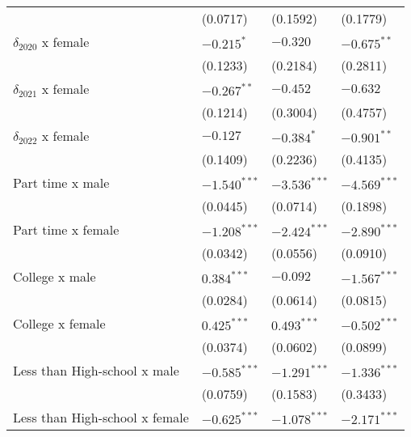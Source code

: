 \begin{tabular}{llll}
                                       &           (0.0717) &           (0.1592) &           (0.1779) \\
$\delta_{2020}$ x female               &         $-0.215^*$ &           $-0.320$ &      $-0.675^{**}$ \\
                                       &           (0.1233) &           (0.2184) &           (0.2811) \\
$\delta_{2021}$ x female               &      $-0.267^{**}$ &           $-0.452$ &           $-0.632$ \\
                                       &           (0.1214) &           (0.3004) &           (0.4757) \\
$\delta_{2022}$ x female               &           $-0.127$ &         $-0.384^*$ &      $-0.901^{**}$ \\
                                       &           (0.1409) &           (0.2236) &           (0.4135) \\
Part time x male                       &     $-1.540^{***}$ &     $-3.536^{***}$ &     $-4.569^{***}$ \\
                                       &           (0.0445) &           (0.0714) &           (0.1898) \\
Part time x female                     &     $-1.208^{***}$ &     $-2.424^{***}$ &     $-2.890^{***}$ \\
                                       &           (0.0342) &           (0.0556) &           (0.0910) \\
College x male                         &      $0.384^{***}$ &           $-0.092$ &     $-1.567^{***}$ \\
                                       &           (0.0284) &           (0.0614) &           (0.0815) \\
College x female                       &      $0.425^{***}$ &      $0.493^{***}$ &     $-0.502^{***}$ \\
                                       &           (0.0374) &           (0.0602) &           (0.0899) \\
Less than High-school x male           &     $-0.585^{***}$ &     $-1.291^{***}$ &     $-1.336^{***}$ \\
                                       &           (0.0759) &           (0.1583) &           (0.3433) \\
Less than High-school x female         &     $-0.625^{***}$ &     $-1.078^{***}$ &     $-2.171^{***}$ \\

\end{tabular}
